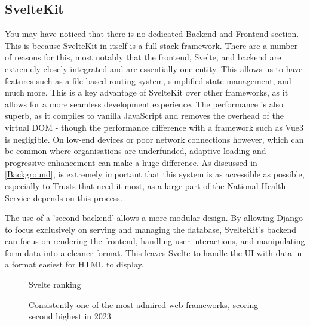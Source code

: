 \subsection{SvelteKit} \label{SvelteKit}
You may have noticed that there is no dedicated Backend and Frontend section. This is because SvelteKit in itself is a full-stack framework. There are a number of reasons for this, most notably that the frontend, Svelte, and backend are extremely closely integrated and are essentially one entity. This allows us to have features such as a file based routing system, simplified state management, and much more. This is a key advantage of SvelteKit over other frameworks, as it allows for a more seamless development experience. The performance is also superb, as it compiles to vanilla JavaScript and removes the overhead of the virtual DOM - though the performance difference with a framework such as Vue3 is negligible. On low-end devices or poor network connections however, which can be common where organisations are underfunded, adaptive loading and progressive enhancement can make a huge difference. As discussed in \ref{Background}, is extremely important that this system is as accessible as possible, especially to Trusts that need it most, as a large part of the National Health Service depends on this process. 

The use of a 'second backend' allows a more modular design. By allowing Django to focus exclusively on serving and managing the database, SvelteKit's backend can focus on rendering the frontend, handling user interactions, and manipulating form data into a cleaner format. This leaves Svelte to handle the UI with data in a format easiest for HTML to display. 

\begin{figure}[h]
\centering
{}
\caption{Svelte ranking}
\vspace{-10pt}
\caption*{Consistently one of the most admired web frameworks, scoring second highest in 2023}
\vspace{-10pt}
\caption*{\parencite{noauthor_stack_nodate}}
\label{fig:svelte}
\vspace{-5pt}
\end{figure}

